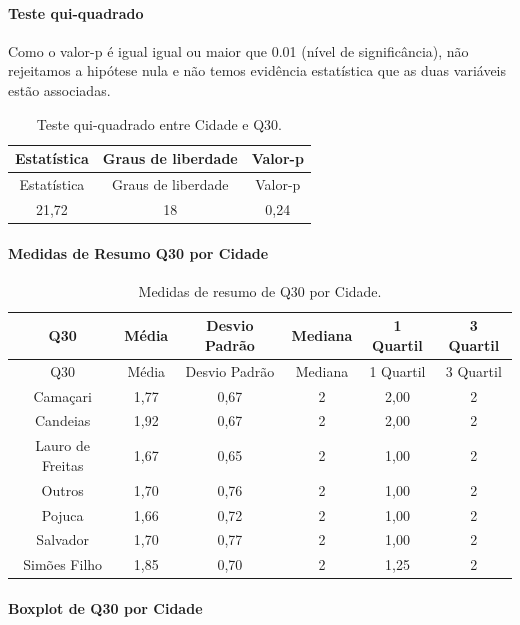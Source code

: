 \documentclass[]{article}
\let\oldparagraph\paragraph
\renewcommand{\paragraph}[1]{\oldparagraph{#1}\mbox{}}
\begin{document}
\hypertarget{teste-qui-quadrado-82}{%
\paragraph{Teste qui-quadrado}\label{teste-qui-quadrado-82}}

Como o valor-p é igual igual ou maior que 0.01 (nível de significância), não rejeitamos a hipótese nula e não temos evidência estatística que as duas variáveis estão associadas.

\begin{longtable}[]{@{}ccc@{}}
\caption{\label{tab:unnamed-chunk-960}Teste qui-quadrado entre Cidade e Q30.}\tabularnewline
\toprule
Estatística & Graus de liberdade & Valor-p\tabularnewline
\midrule
\endfirsthead
\toprule
Estatística & Graus de liberdade & Valor-p\tabularnewline
\midrule
\endhead
21,72 & 18 & 0,24\tabularnewline
\bottomrule
\end{longtable}

\cleardoublepage

\hypertarget{medidas-de-resumo-q30-por-cidade}{%
\paragraph{Medidas de Resumo Q30 por Cidade}\label{medidas-de-resumo-q30-por-cidade}}

\begin{longtable}[]{@{}cccccc@{}}
\caption{\label{tab:unnamed-chunk-961}Medidas de resumo de Q30 por Cidade.}\tabularnewline
\toprule
Q30 & Média & Desvio Padrão & Mediana & 1 Quartil & 3 Quartil\tabularnewline
\midrule
\endfirsthead
\toprule
Q30 & Média & Desvio Padrão & Mediana & 1 Quartil & 3 Quartil\tabularnewline
\midrule
\endhead
Camaçari & 1,77 & 0,67 & 2 & 2,00 & 2\tabularnewline
Candeias & 1,92 & 0,67 & 2 & 2,00 & 2\tabularnewline
Lauro de Freitas & 1,67 & 0,65 & 2 & 1,00 & 2\tabularnewline
Outros & 1,70 & 0,76 & 2 & 1,00 & 2\tabularnewline
Pojuca & 1,66 & 0,72 & 2 & 1,00 & 2\tabularnewline
Salvador & 1,70 & 0,77 & 2 & 1,00 & 2\tabularnewline
Simões Filho & 1,85 & 0,70 & 2 & 1,25 & 2\tabularnewline
\bottomrule
\end{longtable}

\hypertarget{boxplot-de-q30-por-cidade}{%
\paragraph{Boxplot de Q30 por Cidade}\label{boxplot-de-q30-por-cidade}}
\end{document}
